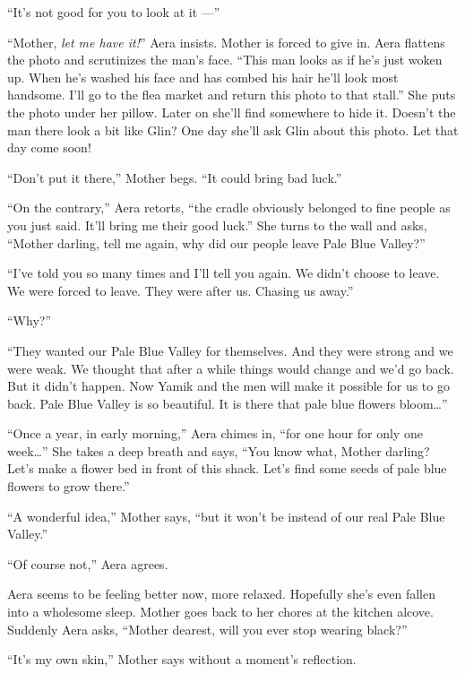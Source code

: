 \documentclass[twoside,11pt,openany]{book}
\begin{document}
``It's not good for you to look at it ---''

``Mother, \textit{let me have it!}'' Aera insists. Mother is forced to give in. Aera flattens
the photo and scrutinizes the man's face. ``This man looks as if he's just woken up. When he's washed his
face and has combed his hair he'll look most handsome. I'll go to the flea market and return this photo to that
stall.'' She puts the photo under her pillow. Later on she'll find somewhere to hide it. Doesn't the man
there look a bit like Glin? One day she'll ask Glin about this photo.  Let that day come soon!

``Don't put it there,'' Mother begs. ``It could bring bad luck.''

``On the contrary,'' Aera retorts, ``the cradle obviously belonged to fine people
as you just said. It'll bring me their good luck.'' She turns to the wall and asks, ``Mother
darling, tell me again, why did our people leave Pale Blue Valley?''

``I've told you so many times and I'll tell you again. We didn't choose to leave. We were forced to
leave. They were after us. Chasing us away.''

``Why?''

``They wanted our Pale Blue Valley for themselves. And they were strong and we were weak. We thought that
after  a while things would change and we'd go back. But it didn't happen. Now Yamik and the men will make it
possible for us to go back.
Pale Blue Valley is so beautiful.
It is there that pale blue flowers bloom{\ldots}''

``Once a year, in early morning,'' Aera chimes in,
``for one hour for only one week{\ldots}''
She takes a deep breath and says, ``You know what, Mother darling? Let's make
a flower bed in front of this shack. Let's find some seeds of pale blue flowers to grow there.''

``A wonderful idea,'' Mother says, ``but it won't be instead of our real Pale
Blue Valley.''

``Of course not,'' Aera agrees.

 Aera seems to be feeling better now, more relaxed. Hopefully she's even fallen into a wholesome sleep. Mother goes back
to her chores at the kitchen alcove. Suddenly Aera asks, ``Mother dearest, will you ever stop wearing
black?''

``It's my{ }own skin,'' Mother says without a moment's reflection.



\chapter{}
\end{document}
